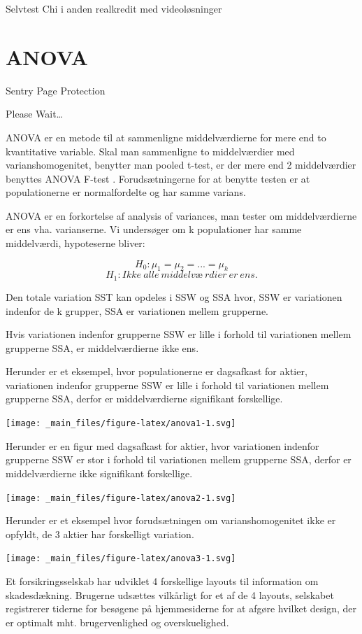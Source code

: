 \documentclass[]{book}
\begin{document}
Selvtest Chi i anden realkredit med videoløsninger

\hypertarget{anova}{%
\chapter{ANOVA}\label{anova}}

\hypertarget{Sentry_noJS}{}
Sentry Page Protection

\hypertarget{Sentry_redirecting}{}
Please Wait\ldots{}

ANOVA er en metode til at sammenligne middelværdierne for mere end to kvantitative variable. Skal man sammenligne to middelværdier med varianshomogenitet, benytter man pooled t-test, er der mere end 2 middelværdier benyttes ANOVA F-test . Forudsætningerne for at benytte testen er at populationerne er normalfordelte og har samme varians.

ANOVA er en forkortelse af analysis of variances, man tester om middelværdierne er ens vha. varianserne.
Vi undersøger om k populationer har samme middelværdi, hypoteserne bliver:

\[H_0:\mu_1=\mu_2=...=\mu_k\]\[H_1:Ikke\ alle\ middelvæ\ rdier\ er\ ens.\]

Den totale variation SST kan opdeles i SSW og SSA hvor, SSW er variationen indenfor de k grupper, SSA er variationen mellem grupperne.

Hvis variationen indenfor grupperne SSW er lille i forhold til variationen mellem grupperne SSA, er middelværdierne ikke ens.

Herunder er et eksempel, hvor populationerne er dagsafkast for aktier, variationen indenfor grupperne SSW er lille i forhold til variationen mellem grupperne SSA, derfor er middelværdierne signifikant forskellige.

\texttt{[image: \_main\_files/figure-latex/anova1-1.svg]}

Herunder er en figur med dagsafkast for aktier, hvor variationen indenfor grupperne SSW er stor i forhold til variationen mellem grupperne SSA, derfor er middelværdierne ikke signifikant forskellige.

\texttt{[image: \_main\_files/figure-latex/anova2-1.svg]}

Herunder er et eksempel hvor forudsætningen om varianshomogenitet ikke er opfyldt, de 3 aktier har forskelligt variation.

\texttt{[image: \_main\_files/figure-latex/anova3-1.svg]}

Et forsikringsselskab har udviklet 4 forskellige layouts til information om skadesdækning. Brugerne udsættes vilkårligt for et af de 4 layouts, selskabet registrerer tiderne for besøgene på hjemmesiderne for at afgøre hvilket design, der er optimalt mht. brugervenlighed og overskuelighed.
\end{document}

